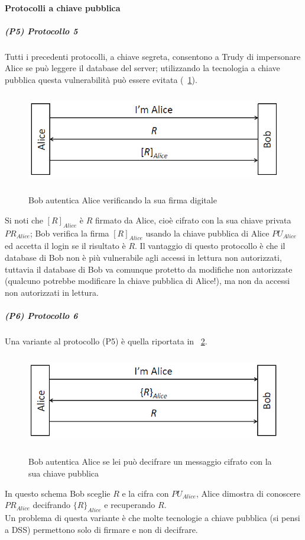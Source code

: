 \paragraph{Protocolli a chiave pubblica}
\subparagraph{(P5) Protocollo 5}
Tutti i precedenti protocolli, a chiave segreta, consentono a Trudy di impersonare Alice se può leggere il database del server; utilizzando la tecnologia a chiave pubblica questa vulnerabilità può essere evitata (\figurename~\ref{fig:ImgS26bis}).
\begin{figure}[htbp]
	\centering%
	\subfigure%
	{\includegraphics[height=4cm, width=12cm, keepaspectratio]{Immagini/autenticazione/ImgS26bis.png}}
	\caption{Bob autentica Alice verificando la sua firma digitale}\label{fig:ImgS26bis} 	
\end{figure}
Si noti che $[R]_{Alice}$ è $R$ firmato da Alice, cioè cifrato con la sua chiave privata $PR_{Alice}$; Bob verifica la firma $[R]_{Alice}$ usando la chiave pubblica di Alice $PU_{Alice}$ ed accetta il login se il risultato è $R$. Il vantaggio di questo protocollo è che il database di Bob non è più vulnerabile agli accessi in lettura non
autorizzati, tuttavia il database di Bob va comunque protetto da modifiche non autorizzate (qualcuno potrebbe modificare la chiave pubblica di Alice!), ma non da accessi non autorizzati in lettura.
\subparagraph{(P6) Protocollo 6}
Una variante al protocollo (P5) è quella riportata in \figurename~\ref{fig:ImgS28bis}.
\begin{figure}[htbp]
	\centering%
	\subfigure%
	{\includegraphics[height=4cm, width=12cm, keepaspectratio]{Immagini/autenticazione/ImgS28bis.png}}
	\caption{Bob autentica Alice se lei può decifrare un messaggio cifrato con la sua chiave pubblica}\label{fig:ImgS28bis} 	
\end{figure}
In questo schema Bob sceglie $R$ e la cifra con $PU_{Alice}$, Alice dimostra di conoscere $PR_{Alice}$ decifrando $\lbrace R\rbrace_{Alice}$ e recuperando $R$.\\
Un problema di questa variante è che molte tecnologie a chiave pubblica (si pensi a DSS) permettono solo di firmare
e non di decifrare.

